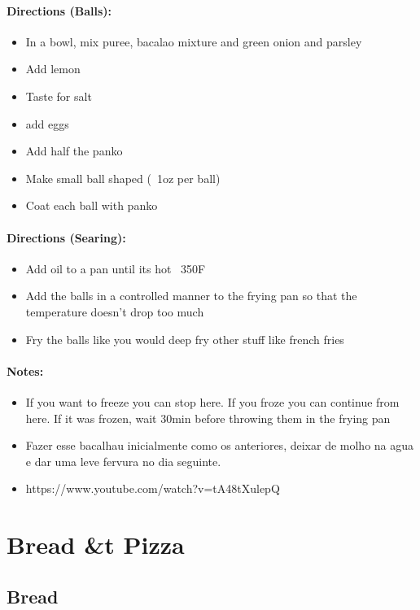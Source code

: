 \documentclass{article}
\begin{document}
\paragraph{Directions (Balls):}
\begin{itemize}
	\item In a bowl, mix puree, bacalao mixture and green onion and parsley
	\item Add lemon
	\item Taste for salt
	\item add  eggs
	\item Add half the panko 
	\item Make small ball shaped (~1oz per ball)
	\item Coat each ball with panko
\end{itemize}

\paragraph{Directions (Searing):}
\begin{itemize}
	\item Add oil to a pan until its hot ~350F
	\item Add the balls in a controlled manner to the frying pan so that the temperature doesn't drop too much
	\item Fry the balls like you would deep fry other stuff like french fries
\end{itemize}

\paragraph{Notes:}
\begin{itemize}
	\item If you want to freeze you can stop here. If you froze you can continue from here. If it was frozen, wait 30min before throwing them in the frying pan
	\item Fazer esse bacalhau inicialmente como os anteriores, deixar de molho na agua e dar uma leve fervura no dia seguinte.
	\item https://www.youtube.com/watch?v=tA48tXulepQ
\end{itemize}

\section{Bread \&t Pizza}

\subsection{Bread}{}
\end{document}
